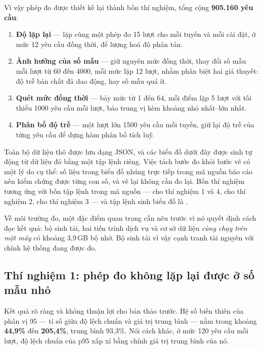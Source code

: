 Vì vậy phép đo được thiết kế lại thành bốn thí nghiệm, tổng cộng \textbf{905.160 yêu cầu}:

\begin{enumerate}
    \item \textbf{Độ lặp lại} --- lặp cùng một phép đo 15 lượt cho mỗi tuyến và mỗi cài đặt, ở mức 12 yêu cầu đồng thời, để lượng hoá độ phân tán.
    \item \textbf{Ảnh hưởng của số mẫu} --- giữ nguyên mức đồng thời, thay đổi số mẫu mỗi lượt từ 60 đến 4000, mỗi mức lặp 12 lượt, nhằm phân biệt hai giả thuyết: độ trễ bản chất đã dao động, hay số mẫu quá ít.
    \item \textbf{Quét mức đồng thời} --- bảy mức từ 1 đến 64, mỗi điểm lặp 5 lượt với tối thiểu 1000 yêu cầu mỗi lượt, báo trung vị kèm khoảng nhỏ nhất--lớn nhất.
    \item \textbf{Phân bố độ trễ} --- một lượt lớn 1500 yêu cầu mỗi tuyến, giữ lại độ trễ của từng yêu cầu để dựng hàm phân bố tích luỹ.
\end{enumerate}

Toàn bộ dữ liệu thô được lưu dạng JSON, và các biểu đồ dưới đây được sinh tự động từ dữ liệu đó bằng một tập lệnh riêng. Việc tách bước đo khỏi bước vẽ có một lý do cụ thể: số liệu trong biểu đồ nhúng trực tiếp trong mã nguồn báo cáo nên kiểm chứng được từng con số, và vẽ lại không cần đo lại. Bốn thí nghiệm tương ứng với bốn tập lệnh trong mã nguồn ---  cho thí nghiệm 1 và 4,  cho thí nghiệm 2,  cho thí nghiệm 3 --- và tập lệnh sinh biểu đồ là .

Về môi trường đo, một đặc điểm quan trọng cần nêu trước vì nó quyết định cách đọc kết quả: bộ sinh tải, hai tiến trình dịch vụ và cơ sở dữ liệu \emph{cùng chạy trên một máy} có khoảng 3,9\,GB bộ nhớ. Bộ sinh tải vì vậy cạnh tranh tài nguyên với chính hệ thống đang được đo.

\subsection{Thí nghiệm 1: phép đo không lặp lại được ở số mẫu nhỏ}





Kết quả rõ ràng và không thuận lợi cho bản thảo trước. Hệ số biến thiên của phân vị 95 --- tỉ số giữa độ lệch chuẩn và giá trị trung bình --- nằm trong khoảng \textbf{44,9\%} đến \textbf{205,4\%}, trung bình 93,3\%. Nói cách khác, ở mức 120 yêu cầu mỗi lượt, độ lệch chuẩn của p95 xấp xỉ bằng chính giá trị trung bình của nó.

